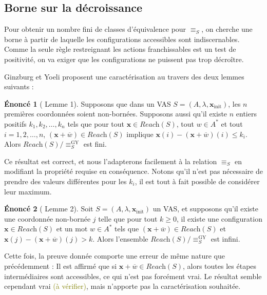 \documentclass[a4paper,final]{article}
\theoremstyle{definition}
\newtheorem*{Statement}{Énoncé}
\let\leq\leqslant
\let\geq\geqslant
\newcommand{\lucas}[1]{\textcolor{olive}{#1}}
\newcommand{\lang}{\ensuremath{\mathcal{L}}}
\newcommand{\reach}{\ensuremath{\textit{Reach}}}
\newcommand{\vect}[1]{\ensuremath{\mathbf{#1}}}
\newcommand{\rel}{\ensuremath{\equiv}}
\newcommand{\relGY}{\ensuremath{\equiv^\text{GY}_S}}
\newcommand{\xinit}{\ensuremath{\vect{x}_\text{init}}}
\newcommand{\valeur}[1]{\ensuremath{\overline{#1}}}
\begin{document}

\subsection{Borne sur la décroissance}

Pour obtenir un nombre fini de classes d'équivalence pour $\rel_S$, on cherche une borne à partir de laquelle les configurations accessibles sont indiscernables.
Comme la seule règle restreignant les actions franchissables est un test de positivité, on va exiger que les configurations ne puissent pas trop décroître.

Ginzburg et Yoeli proposent une caractérisation au travers des deux lemmes suivants :


\begin{Statement}[\cite{giyo80} Lemme 1]
    Supposons que dans un VAS $S=(A,\lambda,\xinit)$, les $n$ premières coordonnées soient non-bornées.
    Supposons aussi qu'il existe $n$ entiers positifs $k_1,k_2,\dots,k_n$ tels que pour tout $\vect{x}\in\reach(S)$, tout $w\in A^\ast$ et tout $i=1,2,\dots,n$, 
    $(\vect{x} +\valeur{w})\in\reach(S)$ implique
    $\vect{x}(i) - (\vect{x} +\valeur{w})(i) \leq k_i$.
    Alors $\reach(S)/\relGY$ est fini.
\end{Statement}

Ce résultat est correct, et nous l'adapterons facilement à la relation $\rel_S$ en modifiant la propriété requise en conséquence.
Notons qu'il n'est pas nécessaire de prendre des valeurs différentes pour les $k_i$, il est tout à fait possible de considérer leur maximum.

\begin{Statement}[\cite{giyo80} Lemme 2]
    Soit $S=(A,\lambda,\xinit)$ un VAS, et supposons qu'il existe une coordonnée non-bornée $j$ telle que 
    pour tout $k\geq 0$, il existe une configuration $\vect{x}\in\reach(S)$ et un mot $w\in A^\ast$ tels que 
    $(\vect{x} +\valeur{w}) \in\reach(S)$ et $\vect{x}(j) - (\vect{x} +\valeur{w})(j) > k$.
    Alors l'ensemble $\reach(S)/\relGY$ est infini.
\end{Statement}

Cette fois, la preuve donnée comporte une erreur de même nature que précédemment :
Il est affirmé que si $\vect{x} +\valeur{w} \in\reach(S)$, alors toutes les étapes intermédiaires sont accessibles, ce qui n'est pas forcément vrai.
Le résultat semble cependant vrai \lucas{(à vérifier)}, mais n'apporte pas la caractérisation souhaitée.
\end{document}
